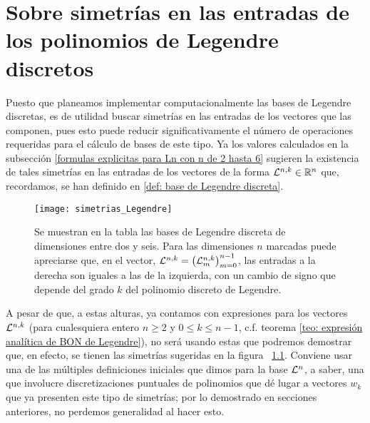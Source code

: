 \chapter{Sobre simetrías en las entradas de los polinomios de Legendre discretos}
\label{section: sobre simetrias en las entradas de los poliomios discretos de Legendre}
Puesto que planeamos implementar computacionalmente
las bases de Legendre discretas, es de utilidad 
buscar simetrías en las entradas de los vectores que las 
componen, pues esto puede reducir significativamente
el número de operaciones requeridas para el cálculo 
de bases de este tipo.
Ya los valores calculados
en la subsección 
\ref{formulas explicitas para Ln con n de 2 hasta 6}
sugieren 
la existencia de tales simetrías en las entradas 
de los vectores de la forma $\mathcal{L}^{n,k} \in \mathbb{R}^{n}$
que, recordamos, se han definido en 
\ref{def: base de Legendre discreta}.


\begin{figure}[H] \label{fig: simetrias entradas Legendre}
\centering\captionsetup{format = hang}
	\begin{measuredfigure}
		\texttt{[image: simetrias\_Legendre]} 
		\caption{ 
		Se muestran en la tabla las bases de Legendre
		discreta de dimensiones entre dos y seis. 		
		Para las dimensiones $n$ marcadas
		puede apreciarse que, en el vector,
		 $\mathcal{L}^{n,k} = \left( \mathcal{L}^{n,k}_{m} \right)_{m=0}^{n-1}$,
		las entradas a la derecha son iguales a las de la izquierda,
		con un cambio de signo que depende del
		grado $k$ del polinomio discreto de Legendre.}
		\label{fig: simetrias entradas Legendre}
 	\end{measuredfigure} 
 \end{figure}

A pesar de que, a estas alturas, ya contamos
con expresiones para los vectores $\mathcal{L}^{n,k}$
(para cualesquiera entero $n \geq 2$ y $0 \leq k \leq n-1$,
c.f. teorema \ref{teo: expresión analítica de BON de Legendre}),
no será usando estas que podremos demostrar que, en efecto,
se tienen las simetrías sugeridas en la figura
~\ref{fig: simetrias entradas Legendre}.
Conviene
usar una de las múltiples definiciones iniciales
que dimos para la base $\mathcal{L}^{n}$, a saber, una
que involucre discretizaciones puntuales de polinomios 
que dé lugar a vectores $w_{k}$ que ya presenten 
este tipo de simetrías; por lo demostrado en secciones anteriores,
no perdemos generalidad al hacer esto. 


